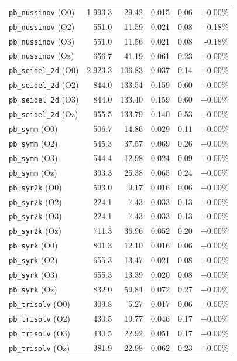 {\begin{longtable}{lrrrrr}
\texttt{pb\_nussinov} (O0) & 1,993.3 & 29.42 & 0.015 & 0.06 & +0.00\% \\
\texttt{pb\_nussinov} (O2) & 551.0 & 11.59 & 0.021 & 0.08 & -0.18\% \\
\texttt{pb\_nussinov} (O3) & 551.0 & 11.56 & 0.021 & 0.08 & -0.18\% \\
\texttt{pb\_nussinov} (Oz) & 656.7 & 41.19 & 0.061 & 0.23 & +0.00\% \\
\texttt{pb\_seidel\_2d} (O0) & 2,923.3 & 106.83 & 0.037 & 0.14 & +0.00\% \\
\texttt{pb\_seidel\_2d} (O2) & 844.0 & 133.54 & 0.159 & 0.60 & +0.00\% \\
\texttt{pb\_seidel\_2d} (O3) & 844.0 & 133.40 & 0.159 & 0.60 & +0.00\% \\
\texttt{pb\_seidel\_2d} (Oz) & 955.5 & 133.79 & 0.140 & 0.53 & +0.00\% \\
\texttt{pb\_symm} (O0) & 506.7 & 14.86 & 0.029 & 0.11 & +0.00\% \\
\texttt{pb\_symm} (O2) & 545.3 & 37.57 & 0.069 & 0.26 & +0.00\% \\
\texttt{pb\_symm} (O3) & 544.4 & 12.98 & 0.024 & 0.09 & +0.00\% \\
\texttt{pb\_symm} (Oz) & 393.3 & 25.38 & 0.065 & 0.24 & +0.00\% \\
\texttt{pb\_syr2k} (O0) & 593.0 & 9.17 & 0.016 & 0.06 & +0.00\% \\
\texttt{pb\_syr2k} (O2) & 224.1 & 7.43 & 0.033 & 0.13 & +0.00\% \\
\texttt{pb\_syr2k} (O3) & 224.1 & 7.43 & 0.033 & 0.13 & +0.00\% \\
\texttt{pb\_syr2k} (Oz) & 711.3 & 36.96 & 0.052 & 0.20 & +0.00\% \\
\texttt{pb\_syrk} (O0) & 801.3 & 12.10 & 0.016 & 0.06 & +0.00\% \\
\texttt{pb\_syrk} (O2) & 655.3 & 13.47 & 0.021 & 0.08 & +0.00\% \\
\texttt{pb\_syrk} (O3) & 655.3 & 13.39 & 0.020 & 0.08 & +0.00\% \\
\texttt{pb\_syrk} (Oz) & 832.0 & 59.84 & 0.072 & 0.27 & +0.00\% \\
\texttt{pb\_trisolv} (O0) & 309.8 & 5.27 & 0.017 & 0.06 & +0.00\% \\
\texttt{pb\_trisolv} (O2) & 430.5 & 19.77 & 0.046 & 0.17 & +0.00\% \\
\texttt{pb\_trisolv} (O3) & 430.5 & 22.92 & 0.051 & 0.17 & +0.00\% \\
\texttt{pb\_trisolv} (Oz) & 381.9 & 22.98 & 0.062 & 0.23 & +0.00\% \\

\end{longtable}}
